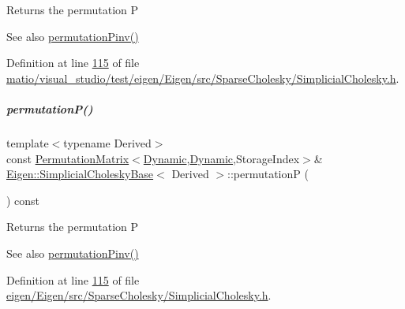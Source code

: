 \begin{DoxyReturn}{Returns}
the permutation P 
\end{DoxyReturn}
\begin{DoxySeeAlso}{See also}
\hyperlink{group___sparse_cholesky___module_a0e23d1f4a88c211be7098faf1cb41674}{permutation\+Pinv()} 
\end{DoxySeeAlso}


Definition at line \hyperlink{matio_2visual__studio_2test_2eigen_2_eigen_2src_2_sparse_cholesky_2_simplicial_cholesky_8h_source_l00115}{115} of file \hyperlink{matio_2visual__studio_2test_2eigen_2_eigen_2src_2_sparse_cholesky_2_simplicial_cholesky_8h_source}{matio/visual\+\_\+studio/test/eigen/\+Eigen/src/\+Sparse\+Cholesky/\+Simplicial\+Cholesky.\+h}.

\mbox{\label{group___sparse_cholesky___module_aff1480e595a21726beaec9a586a94d5a}} 
\subparagraph{\texorpdfstring{permutation\+P()}{permutationP()}\hspace{0.1cm}{\footnotesize\ttfamily [2/2]}}
{\footnotesize\ttfamily template$<$typename Derived$>$ \\
const \hyperlink{group___core___module_class_eigen_1_1_permutation_matrix}{Permutation\+Matrix}$<$\hyperlink{namespace_eigen_ad81fa7195215a0ce30017dfac309f0b2}{Dynamic},\hyperlink{namespace_eigen_ad81fa7195215a0ce30017dfac309f0b2}{Dynamic},Storage\+Index$>$\& \hyperlink{group___sparse_cholesky___module_class_eigen_1_1_simplicial_cholesky_base}{Eigen\+::\+Simplicial\+Cholesky\+Base}$<$ Derived $>$\+::permutationP (\begin{DoxyParamCaption}{ }\end{DoxyParamCaption}) const\hspace{0.3cm}{\ttfamily [inline]}}

\begin{DoxyReturn}{Returns}
the permutation P 
\end{DoxyReturn}
\begin{DoxySeeAlso}{See also}
\hyperlink{group___sparse_cholesky___module_a0e23d1f4a88c211be7098faf1cb41674}{permutation\+Pinv()} 
\end{DoxySeeAlso}


Definition at line \hyperlink{eigen_2_eigen_2src_2_sparse_cholesky_2_simplicial_cholesky_8h_source_l00115}{115} of file \hyperlink{eigen_2_eigen_2src_2_sparse_cholesky_2_simplicial_cholesky_8h_source}{eigen/\+Eigen/src/\+Sparse\+Cholesky/\+Simplicial\+Cholesky.\+h}.

